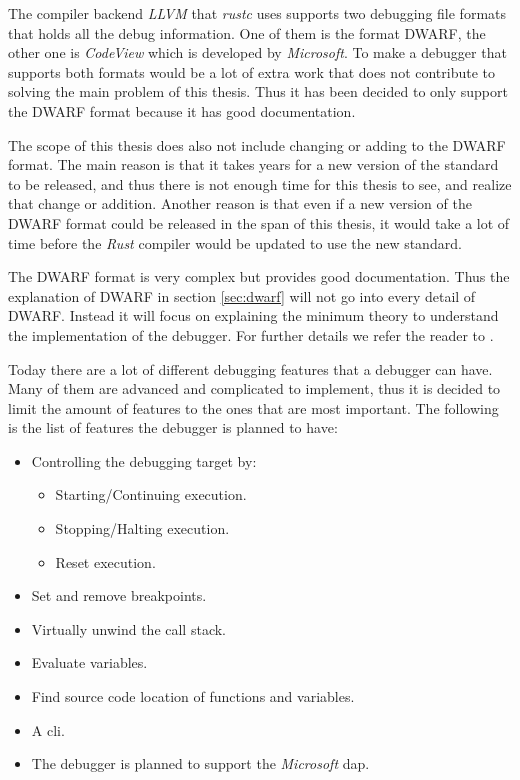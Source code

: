 The compiler backend \emph{LLVM} that \emph{rustc} uses supports two debugging file formats that holds all the debug information.
One of them is the format \gls{DWARF}, the other one is \emph{CodeView} which is developed by \emph{Microsoft}.
To make a debugger that supports both formats would be a lot of extra work that does not contribute to solving the main problem of this thesis.
Thus it has been decided to only support the \gls{DWARF} format because it has good documentation.


The scope of this thesis does also not include changing or adding to the \gls{DWARF} format.
The main reason is that it takes years for a new version of the standard to be released, and thus there is not enough time for this thesis to see, and realize that change or addition.
Another reason is that even if a new version of the \gls{DWARF} format could be released in the span of this thesis, it would take a lot of time before the \emph{Rust} compiler would be updated to use the new standard.


The \gls{DWARF} format is very complex but provides good documentation.
Thus the explanation of \gls{DWARF} in section \ref{sec:dwarf} will not go into every detail of \gls{DWARF}.
Instead it will focus on explaining the minimum theory to understand the implementation of the debugger.
For further details we refer the reader to \cite{dwarf}.


Today there are a lot of different debugging features that a debugger can have.
Many of them are advanced and complicated to implement, thus it is decided to limit the amount of features to the ones that are most important.
The following is the list of features the debugger is planned to have:

\begin{itemize}
  \item Controlling the debugging target by:
  \begin{itemize}
    \item Starting/Continuing execution.
    \item Stopping/Halting execution.
    \item Reset execution.
  \end{itemize}
  \item Set and remove breakpoints.
  \item Virtually unwind the call stack.
  \item Evaluate variables.
  \item Find source code location of functions and variables.
  \item A \acrfull{cli}.
  \item The debugger is planned to support the \emph{Microsoft} \acrfull{dap}.
\end{itemize}


